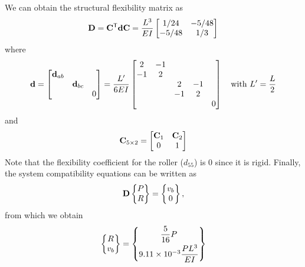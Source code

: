 \begin{example}[Beam]
We can obtain the structural flexibility matrix as
\begin{equation*}
  \mathbf{D} = \mathbf{C}^{\mathsf{T}}\mathbf{d}\mathbf{C} = \frac{L^3}{EI}\begin{bmatrix}1/24 & -5/48\\ -5/48 & 1/3\end{bmatrix}
\end{equation*}
where
\begin{equation*}
  \mathbf{d} = \begin{bmatrix}\mathbf{d}_{ab} & & \\ & \mathbf{d}_{bc} & \\ & & 0\end{bmatrix} = \frac{L'}{6EI}\begin{bmatrix}2 & -1 & & & \\ -1 & 2 & & & \\ & & 2 & -1 & \\ & & -1 & 2 & \\ & & & & 0\end{bmatrix}\quad\text{with } L' = \frac L2
\end{equation*}
and
\begin{equation*}
  \mathbf{C}_{5\times2} = \begin{bmatrix}\mathbf{C}_1 & \mathbf{C}_2\\ 0 & 1\end{bmatrix}
\end{equation*}
Note that the flexibility coefficient for the roller ($d_{55}$) is 0 since it is rigid. Finally, the system compatibility equations can be written as
\begin{equation*}
  \mathbf{D}\begin{Bmatrix}P\\ R\end{Bmatrix} = \begin{Bmatrix}v_b\\ 0\end{Bmatrix},
\end{equation*}
from which we obtain
\begin{equation*}
  \begin{Bmatrix}R\\ v_b\end{Bmatrix} = \begin{Bmatrix}\dfrac{5}{16}P\\[6pt] 9.11\times10^{-3}\dfrac{PL^3}{EI}\end{Bmatrix}
\end{equation*}


\end{example}
